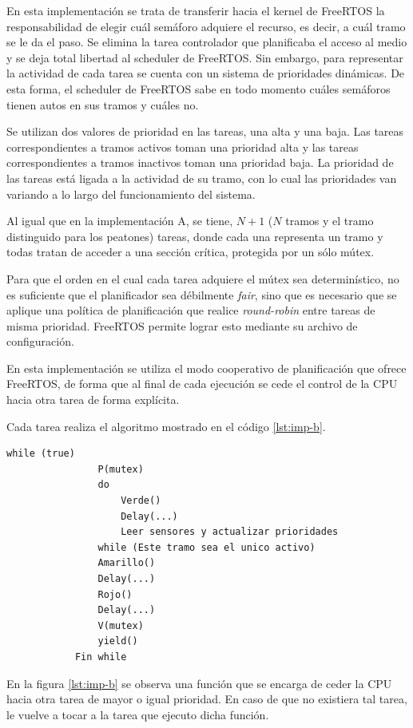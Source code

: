 		En esta implementación se trata de transferir hacia el kernel de FreeRTOS la responsabilidad de elegir cuál semáforo adquiere el recurso, es decir, a cuál tramo se le da el paso.
		Se elimina la tarea controlador que planificaba el acceso al medio y se deja total libertad al scheduler de FreeRTOS.
		Sin embargo, para representar la actividad de cada tarea se cuenta con un sistema de prioridades dinámicas.
		De esta forma, el scheduler de FreeRTOS sabe en todo momento cuáles semáforos tienen autos en sus tramos y cuáles no.

		Se utilizan dos valores de prioridad en las tareas, una alta y una baja.
		Las tareas correspondientes a tramos activos toman una prioridad alta y las tareas correspondientes a tramos inactivos toman una prioridad baja. 
		La prioridad de las tareas está ligada a la actividad de su tramo, con lo cual las prioridades van variando a lo largo del funcionamiento del sistema.

		Al igual que en la implementación A, se tiene, $N + 1$ ($N$ tramos y el tramo distinguido para los peatones) tareas, donde cada una representa un tramo y todas tratan de acceder a una sección crítica, protegida por un sólo mútex.

		Para que el orden en el cual cada tarea adquiere el mútex sea determinístico, no es suficiente que el planificador sea débilmente \emph{fair}, sino que es necesario que se aplique una política de planificación que realice \emph{round-robin} entre tareas de misma prioridad.
		FreeRTOS permite lograr esto mediante su archivo de configuración.

		En esta implementación se utiliza el modo cooperativo de planificación que ofrece FreeRTOS, de forma que al final de cada ejecución se cede el control de la CPU hacia otra tarea de forma explícita.

		Cada tarea realiza el algoritmo mostrado en el código \ref{lst:imp-b}.

		\begin{lstlisting}[float, label=lst:imp-b, caption=Pseudocódigo del programa que corre cada tarea en la implementación B.]
			while (true)
				P(mutex)
				do
					Verde()
					Delay(...)
					Leer sensores y actualizar prioridades
				while (Este tramo sea el unico activo)
				Amarillo()
				Delay(...)
				Rojo()
				Delay(...)
				V(mutex)
				yield()
			Fin while
		\end{lstlisting}

		En la figura \ref{lst:imp-b} se observa una función  que se encarga de ceder la CPU hacia otra tarea de mayor o igual prioridad.
		En caso de que no existiera tal tarea, le vuelve a tocar a la tarea que ejecuto dicha función.



